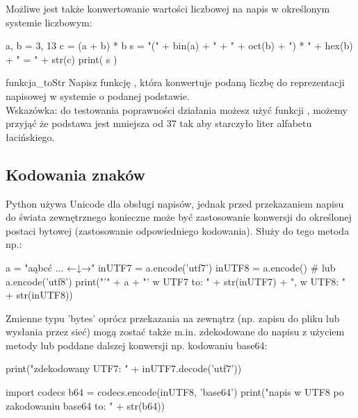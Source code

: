 \documentclass{pdfBooklets}
\begin{document}
Możliwe jest także konwertowanie wartości liczbowej na napis w określonym systemie liczbowym:

\begin{CodeFrame*}[python]{}
a, b = 3, 13
c = (a + b) * b
s = "(" + bin(a) + " + " + oct(b) + ") * " + hex(b) + " = " + str(c)
print( s )
\end{CodeFrame*} 

\begin{Zadanie}{}{funkcja_toStr}
Napisz funkcję , która konwertuje podaną liczbę do reprezentacji napisowej w systemie o podanej podstawie.\\
Wskazówka: do testowania poprawności działania możesz użyć funkcji , możemy przyjąć że podstawa jest mniejsza od 37 tak aby starczyło liter alfabetu łacińskiego.
\end{Zadanie}

\subsection{Kodowania znaków}

Python używa Unicode dla obsługi napisów, jednak przed przekazaniem napisu do świata zewnętrznego konieczne może być zastosowanie konwersji do określonej postaci bytowej (zastosowanie odpowiedniego kodowania).
Służy do tego metoda  np.:

\begin{CodeFrame*}[python]{}
a = "aąbcć ... ←↓→"
inUTF7 = a.encode('utf7')
inUTF8 =  a.encode() # lub a.encode('utf8')
print("'" + a + "' w UTF7 to: " + str(inUTF7) + ", w UTF8: " + str(inUTF8))
\end{CodeFrame*}

Zmienne typu 'bytes' oprócz przekazania na zewnątrz (np. zapisu do pliku lub wysłania przez sieć) mogą zostać także m.in. zdekodowane do napisu z użyciem metody  lub poddane dalszej konwersji np. kodowaniu base64:

\begin{CodeFrame*}[python]{}
print("zdekodowany UTF7: " + inUTF7.decode('utf7'))

import codecs
b64 = codecs.encode(inUTF8, 'base64')
print("napis w UTF8 po zakodowaniu base64 to: " + str(b64))
\end{CodeFrame*}
\end{document}
